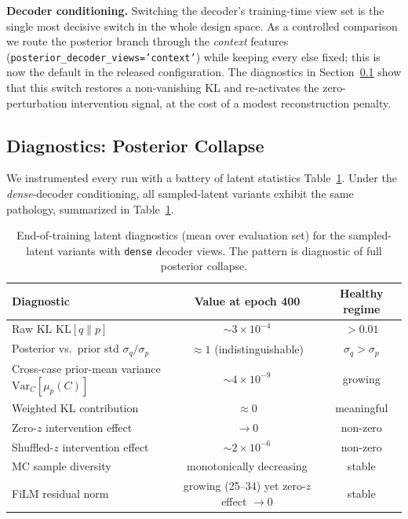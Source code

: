 \textbf{Decoder conditioning.}
\label{sec:exp:ablation:views}
Switching the decoder's training-time view set is the single most
decisive switch in the whole design space. As a controlled comparison we
route the posterior branch through the \emph{context} features
(\texttt{posterior\_decoder\_views='context'}) while keeping every else
fixed; this is now the default in the released configuration. The
diagnostics in Section~\ref{sec:exp:collapse} show that this switch
restores a non-vanishing KL and re-activates the zero-perturbation
intervention signal, at the cost of a modest reconstruction penalty.

\subsection{Diagnostics: Posterior Collapse}
\label{sec:exp:collapse}

We instrumented every run with a battery of latent statistics
Table~\ref{tab:diag}. Under the \emph{dense}-decoder conditioning, all
sampled-latent variants exhibit the same pathology, summarized in
Table~\ref{tab:diag}.

\begin{table}[t]
\centering
\caption{End-of-training latent diagnostics (mean over evaluation set)
for the sampled-latent variants with \texttt{dense} decoder views. The
pattern is diagnostic of full posterior collapse.}
\label{tab:diag}
\begin{tabular}{@{}lcc@{}}
\toprule
Diagnostic & Value at epoch 400 & Healthy regime \\
\midrule
Raw KL $\mathrm{KL}[q\|p]$ & ${\sim}3{\times}10^{-4}$ & $>0.01$ \\
Posterior vs.\ prior std $\sigma_q/\sigma_p$ & $\approx 1$ (indistinguishable) & $\sigma_q>\sigma_p$ \\
Cross-case prior-mean variance $\mathrm{Var}_C[\mu_p(C)]$ & ${\sim}4{\times}10^{-9}$ & growing \\
Weighted KL contribution & $\approx 0$ & meaningful \\
Zero-$z$ intervention effect & $\rightarrow 0$ & non-zero \\
Shuffled-$z$ intervention effect & ${\sim}2{\times}10^{-6}$ & non-zero \\
MC sample diversity & monotonically decreasing & stable \\
FiLM residual norm & growing (25--34) yet zero-$z$ effect $\to 0$ & stable \\
\bottomrule
\end{tabular}
\end{table}

